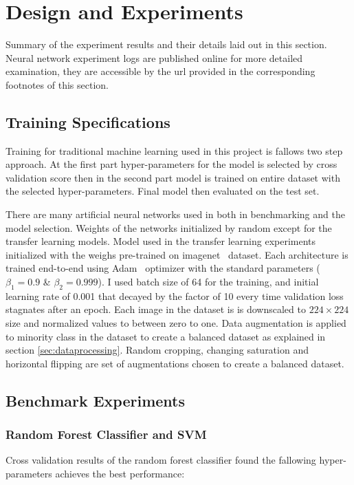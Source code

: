 \chapter{Design and Experiments}
Summary of the experiment results and their details laid out in this section.
Neural network experiment logs are published online for more detailed examination, they are accessible by the url provided in the corresponding footnotes of this section.

\section{Training Specifications}
Training for traditional machine learning used in this project is fallows two step approach.
At the first part hyper-parameters for the model is selected by cross validation score then in the second part model is trained on entire dataset with the selected hyper-parameters.
Final model then evaluated on the test set.

There are many artificial neural networks used in both in benchmarking and the model selection.
Weights of the networks initialized by random except for the transfer learning models.
Model used in the transfer learning experiments initialized with the weighs pre-trained on imagenet~\cite{imagenet} dataset.
Each architecture is trained end-to-end using Adam~\cite{adam} optimizer with the standard parameters ($\beta_1 = 0.9$ \& $\beta_2 = 0.999$).
I used batch size of 64 for the training, and initial learning rate of 0.001 that decayed by the factor of 10 every time validation loss stagnates after an epoch.
Each image in the dataset is is downscaled to $224 \times 224$ size and normalized values to between zero to one.
Data augmentation is applied to minority class in the dataset to create a balanced dataset as explained in section \ref{sec:dataprocessing}.
Random cropping, changing saturation and horizontal flipping are set of augmentations chosen to create a balanced dataset.


\section{Benchmark Experiments}

\subsection{Random Forest Classifier and SVM}
Cross validation results of the random forest classifier found the fallowing hyper-parameters achieves the best performance:

